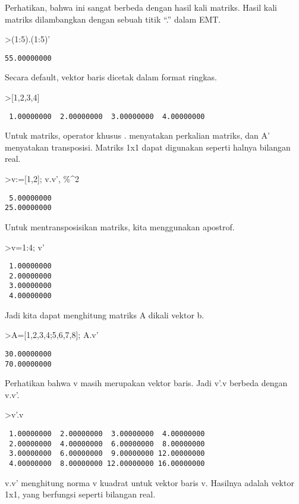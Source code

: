 \documentclass[
]{book}
\begin{document}
Perhatikan, bahwa ini sangat berbeda dengan hasil kali matriks. Hasil kali matriks dilambangkan dengan sebuah titik ``.'' dalam EMT.

\textgreater(1:5).(1:5)'

\begin{verbatim}
55.00000000 
\end{verbatim}

Secara default, vektor baris dicetak dalam format ringkas.

\textgreater{[}1,2,3,4{]}

\begin{verbatim}
 1.00000000  2.00000000  3.00000000  4.00000000 
\end{verbatim}

Untuk matriks, operator khusus . menyatakan perkalian matriks, dan A' menyatakan transposisi. Matriks 1x1 dapat digunakan seperti halnya bilangan real.

\textgreater v:={[}1,2{]}; v.v', \%\^{}2

\begin{verbatim}
 5.00000000 
25.00000000 
\end{verbatim}

Untuk mentransposisikan matriks, kita menggunakan apostrof.

\textgreater v=1:4; v'

\begin{verbatim}
 1.00000000 
 2.00000000 
 3.00000000 
 4.00000000 
\end{verbatim}

Jadi kita dapat menghitung matriks A dikali vektor b.

\textgreater A={[}1,2,3,4;5,6,7,8{]}; A.v'

\begin{verbatim}
30.00000000 
70.00000000 
\end{verbatim}

Perhatikan bahwa v masih merupakan vektor baris. Jadi v'.v berbeda dengan v.v'.

\textgreater v'.v

\begin{verbatim}
 1.00000000  2.00000000  3.00000000  4.00000000 
 2.00000000  4.00000000  6.00000000  8.00000000 
 3.00000000  6.00000000  9.00000000 12.00000000 
 4.00000000  8.00000000 12.00000000 16.00000000 
\end{verbatim}

v.v' menghitung norma v kuadrat untuk vektor baris v. Hasilnya adalah vektor 1x1, yang berfungsi seperti bilangan real.
\end{document}
